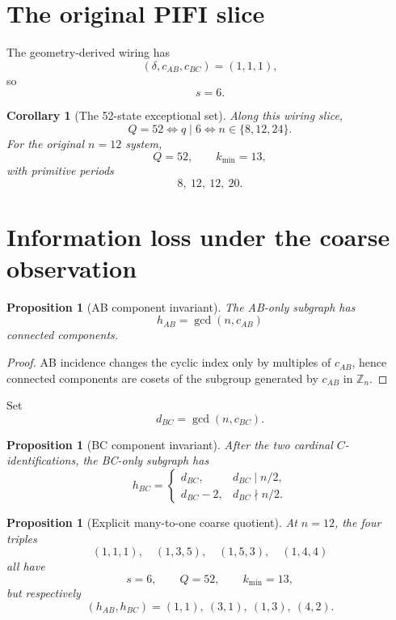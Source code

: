 \documentclass[11pt,a4paper]{article}
\newtheorem{proposition}[theorem]{Proposition}
\newtheorem{corollary}[theorem]{Corollary}
\theoremstyle{definition}
\newcommand{\ZZ}{\mathbb Z}
\begin{document}
\section{The original PIFI slice}\label{sec:pifi}

The geometry-derived wiring has
\[
\boxed{(\delta,c_{AB},c_{BC})=(1,1,1),}
\]
so
\[
\boxed{s=6.}
\]

\begin{corollary}[The 52-state exceptional set]\label{cor:52}
Along this wiring slice,
\[
\boxed{
Q=52
\iff
q\mid6
\iff
n\in\{8,12,24\}.
}
\]
For the original \(n=12\) system,
\[
\boxed{Q=52,\qquad k_{\min}=13,}
\]
with primitive periods
\[
\boxed{8,\ 12,\ 12,\ 20.}
\]
\end{corollary}

\section{Information loss under the coarse observation}\label{sec:loss}

\begin{proposition}[AB component invariant]\label{prop:hAB}
The AB-only subgraph has
\[
\boxed{h_{AB}=\gcd(n,c_{AB})}
\]
connected components.
\end{proposition}

\begin{proof}
AB incidence changes the cyclic index only by multiples of \(c_{AB}\), hence connected components are cosets of the subgroup generated by \(c_{AB}\) in \(\ZZ_n\).
\end{proof}

Set
\[
d_{BC}=\gcd(n,c_{BC}).
\]

\begin{proposition}[BC component invariant]\label{prop:hBC}
After the two cardinal \(C\)-identifications, the BC-only subgraph has
\[
\boxed{
h_{BC}=
\begin{cases}
d_{BC},&d_{BC}\mid n/2,\\
d_{BC}-2,&d_{BC}\nmid n/2.
\end{cases}}
\]
\end{proposition}

\begin{proposition}[Explicit many-to-one coarse quotient]\label{prop:manytoone}
At \(n=12\), the four triples
\[
(1,1,1),\quad
(1,3,5),\quad
(1,5,3),\quad
(1,4,4)
\]
all have
\[
s=6,\qquad Q=52,\qquad k_{\min}=13,
\]
but respectively
\[
(h_{AB},h_{BC})
=
(1,1),\ (3,1),\ (1,3),\ (4,2).
\]
\end{proposition}
\end{document}
